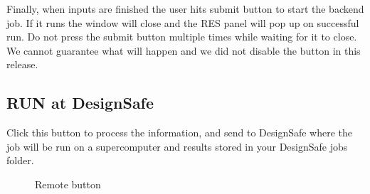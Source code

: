 Finally, when inputs are finished the user hits submit button to start the backend job. If it runs the window will close and the RES 
panel will pop up on successful run. Do not press the submit button multiple times while waiting for it to close. We cannot guarantee 
what will happen and we did not disable the button in this release.

\subsection{RUN at DesignSafe}
Click this button to process the information, and send to DesignSafe where the job will be run on a supercomputer and results stored in your DesignSafe jobs folder.

\begin{figure}[!htbp]
  \caption{Remote button}
  \label{fig:figure16}
\end{figure}

